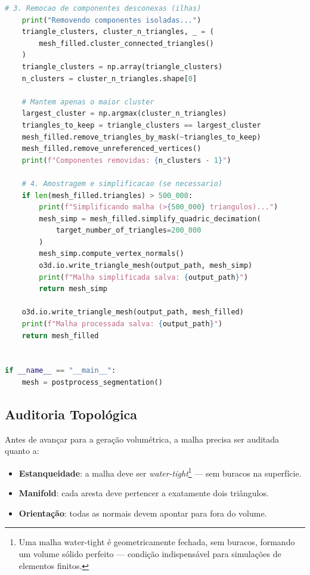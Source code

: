\begin{lstlisting}[language=Python, caption={Pós-processamento de malha com Open3D}, label={lst:open3d_post}]
    # 3. Remocao de componentes desconexas (ilhas)
    print("Removendo componentes isoladas...")
    triangle_clusters, cluster_n_triangles, _ = (
        mesh_filled.cluster_connected_triangles()
    )
    triangle_clusters = np.array(triangle_clusters)
    n_clusters = cluster_n_triangles.shape[0]
    
    # Mantem apenas o maior cluster
    largest_cluster = np.argmax(cluster_n_triangles)
    triangles_to_keep = triangle_clusters == largest_cluster
    mesh_filled.remove_triangles_by_mask(~triangles_to_keep)
    mesh_filled.remove_unreferenced_vertices()
    print(f"Componentes removidas: {n_clusters - 1}")
    
    # 4. Amostragem e simplificacao (se necessario)
    if len(mesh_filled.triangles) > 500_000:
        print(f"Simplificando malha (>{500_000} triangulos)...")
        mesh_simp = mesh_filled.simplify_quadric_decimation(
            target_number_of_triangles=200_000
        )
        mesh_simp.compute_vertex_normals()
        o3d.io.write_triangle_mesh(output_path, mesh_simp)
        print(f"Malha simplificada salva: {output_path}")
        return mesh_simp
    
    o3d.io.write_triangle_mesh(output_path, mesh_filled)
    print(f"Malha processada salva: {output_path}")
    return mesh_filled


if __name__ == "__main__":
    mesh = postprocess_segmentation()
\end{lstlisting}

\subsection{Auditoria Topológica}

Antes de avançar para a geração volumétrica, a malha precisa ser
auditada quanto a:

\begin{itemize}
    \item \textbf{Estanqueidade}: a malha deve ser
        \textit{water-tight}\footnote{Uma malha water-tight é
        geometricamente fechada, sem buracos, formando um volume
        sólido perfeito — condição indispensável para simulações
        de elementos finitos.} — sem buracos na superfície.
    \item \textbf{Manifold}: cada aresta deve pertencer a exatamente
        dois triângulos.
    \item \textbf{Orientação}: todas as normais devem apontar para
        fora do volume.
\end{itemize}

